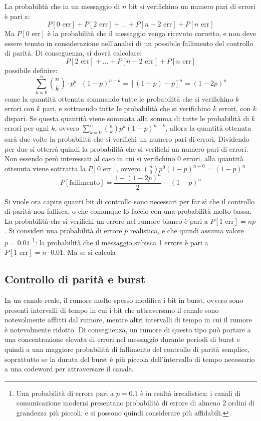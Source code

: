 La probabilità che in un messaggio di $n$ bit si verifichino un numero pari
di errori è pari a:
\[
    P[0 \text{ err}] + P[2 \text{ err}] + \ldots + P[n-2 \text{ err}] + P[n \text{ err}]
\]
Ma $P[0 \text{ err}]$ è la probabilità che il messaggio venga ricevuto corretto,
e non deve essere tenuto in considerazione nell'analisi di un possibile
fallimento del controllo di parità.
Di conseguenza, si dovrà calcolare:
\[
    P[2 \text{ err}] + \ldots + P[n-2 \text{ err}] + P[n \text{ err}]
\]
\upperAccE possibile definire:
\[
    \sum_{k=0}^{n} \binom{n}{k} \cdot p^k \cdot (1-p)^{n-k} =
    [(1-p)-p]^n = (1-2p)^n
\]
come la quantità ottenuta sommando tutte le probabilità che si verifichino
$k$ errori con $k$ pari, e sottraendo tutte le probabilità
che si verifichino $k$ errori, con $k$ dispari.
Se questa quantità viene sommata alla somma di tutte le probabilità di $k$
errori per ogni $k$, ovvero $\sum_{k=0}^{n} \binom{n}{k} p^k (1-p)^{n-k}$,
allora la quantità ottenuta sarà due volte la probabilità che si verifichi
un numero pari di errori. Dividendo per due si otterrà quindi
la probabilità che si verifichi un numero pari di errori. Non essendo però
interessati al caso in cui si verifichino 0 errori, alla quantità ottenuta
viene sottratta la $P[0 \text{ err}]$, ovvero $\binom{n}{0} p^0 (1-p)^{n-0} = (1-p)^n$
\[
    P[\text{fallimento}] = \frac{1 + (1-2p)^n}{2} - (1-p)^n
\]

Si vuole ora capire quanti bit di controllo sono necessari per far sì che
il controllo di parità non fallisca, o che comunque lo faccio con una probabilità
molto bassa.
La probabilità che si verifichi un errore nel rumore bianco è pari a
$P[1 \text{ err}] = np$. Si consideri una probabilità di errore $p$ realistica,
e che quindi assuma valore $p=0.01$ \footnote{Una probabilità di errore
pari a $p = 0.1$ è in realtà irrealistica: i canali di comunicazione moderni
presentano probabilità di errore di almeno 2 ordini di grandezza più piccoli,
e si possono quindi considerare più affidabili.}: la probabilità che il
messaggio subisca 1 errore è pari a $P[1 \text{ err}] = n \cdot 0.01$.
Ma se si calcola

\subsection{Controllo di parità e burst}
In un canale reale, il rumore molto spesso modifica i bit in burst,
ovvero sono presenti intervalli di tempo in cui i bit che attraversano il canale
sono notevolmente afflitti dal rumore, mentre altri intervalli di tempo in cui
il rumore è notevolmente ridotto.
Di conseguenza, un rumore di questo tipo può portare a una concentrazione
elevata di errori nel messaggio durante periodi di burst e quindi a
una maggiore probabilità di fallimento del controllo di parità semplice,
soprattutto se la durata del burst è più piccola dell'intervallo
di tempo necessario a una codeword per attraversare il canale.

